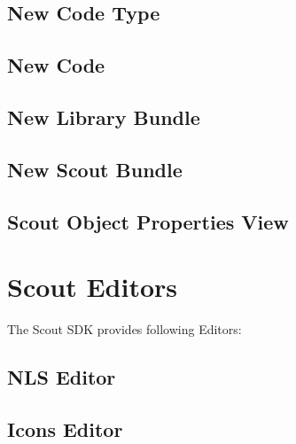 \documentclass[a4paper,10pt,twoside]{book}
\begin{document}
\subsection*{New Code Type}

\subsection*{New Code}

\subsection*{New Library Bundle}

\subsection*{New Scout Bundle}



\subsection*{Scout Object Properties View}

\section*{Scout Editors}

The Scout SDK provides following Editors:
\subsection*{NLS Editor}

\subsection*{Icons Editor}


\end{document}
